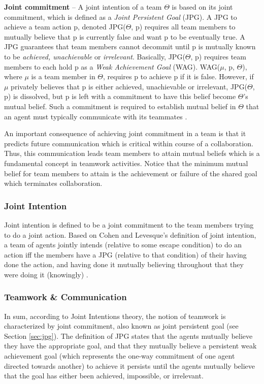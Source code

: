 \documentclass[11pt]{article}
\begin{document}
\textbf{Joint commitment} -- A joint intention of a team $\Theta$ is based on
its joint commitment, which is defined as a \textit{Joint Persistent Goal}
(JPG). A JPG to achieve a team action p, denoted JPG($\Theta$, p) requires all
team members to mutually believe that p is currently false and want p to be
eventually true. A JPG guarantees that team members cannot decommit until p is
mutually known to be \textit{achieved, unachievable} or \textit{irrelevant}.
Basically, JPG($\Theta$, p) requires team members to each hold p as a
\textit{Weak Achievement Goal} (WAG). WAG($\mu$, p, $\Theta$), where $\mu$ is a
team member in $\Theta$, requires p to achieve p if it is false. However, if
$\mu$ privately believes that p is either achieved, unachievable or irrelevant,
JPG($\Theta$, p) is dissolved, but p is left with a commitment to have this
belief become $\Theta$'s mutual belief. Such a commitment is required to
establish mutual belief in $\Theta$ that an agent must typically communicate
with its teammates \cite{cohen:teamwork}.

An important consequence of achieving joint commitment in a team is that it
predicts future communication which is critical within course of a
collaboration. Thus, this communication leads team members to attain mutual
beliefs which is a fundamental concept in teamwork activities. Notice that
the minimum mutual belief for team members to attain is the achievement or
failure of the shared goal which terminates collaboration.

\subsubsection{Joint Intention}

Joint intention is defined to be a joint commitment to the team members trying
to do a joint action. Based on Cohen and Levesque's definition of joint
intention, a team of agents jointly intends (relative to some escape condition)
to do an action iff the members have a JPG (relative to that condition) of their
having done the action, and having done it mutually believing throughout that
they were doing it (knowingly) \cite{cohen:teamwork}.

\subsubsection{Teamwork \& Communication}

In sum, according to Joint Intentions theory, the notion of teamwork is
characterized by joint commitment, also known as joint persistent goal (see
Section \ref{sec:jpg}). The definition of JPG states that the agents mutually
believe they have the appropriate goal, and that they mutually believe a
persistent weak achievement goal (which represents the one-way commitment of one
agent directed towards another) to achieve it persists until the agents mutually
believe that the goal has either been achieved, impossible, or irrelevant.
\end{document}
